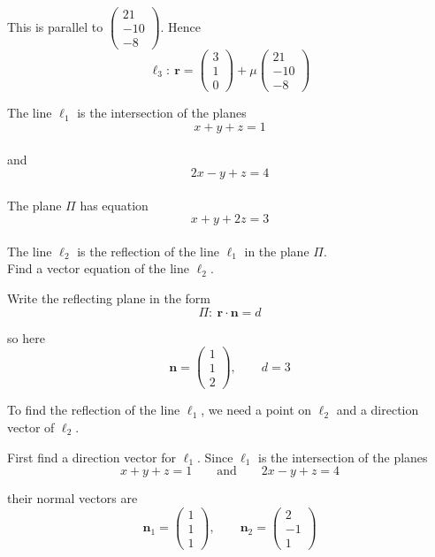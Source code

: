 \documentclass[leqno]{article}
\begin{document}
\begin{enumerate}[
  label=\textbf{\arabic*.},
  leftmargin=*,
  topsep=0pt,
  partopsep=0pt,
  parsep=0pt
]
\begin{djsSolution}
\begin{enumerate}[label=\textbf{(\alph*)}]
{\par}

\vspace{8pt}
This is parallel to \(\begin{pmatrix}21\\-10\\-8\end{pmatrix}\). Hence
\[
\ell_3:\ \mathbf r=
\begin{pmatrix}3\\1\\0\end{pmatrix}
+\mu
\begin{pmatrix}21\\-10\\-8\end{pmatrix}
\]
\end{enumerate}
\end{djsSolution}


\newpage

\questionitem

The line $\ell_1$ is the intersection of the planes
\[
x+y+z=1
\] \\
and
\[
2x-y+z=4
\] \\
The plane $\Pi$ has equation
\[
x+y+2z=3
\] \\
The line $\ell_2$ is the reflection of the line $\ell_1$ in the plane $\Pi$. \\

Find a vector equation of the line $\ell_2$. 

\vspace*{10pt}

\begin{djsSolution}
Write the reflecting plane in the form
\[
\Pi:\ \mathbf r\cdot \mathbf n=d
\]

so here
\[
\mathbf n=\begin{pmatrix}1\\1\\2\end{pmatrix},
\qquad d=3
\]

To find the reflection of the line \(\ell_1\), we need a point on \(\ell_2\) and a direction vector of \(\ell_2\).

First find a direction vector for \(\ell_1\). Since \(\ell_1\) is the intersection of the planes
\[
x+y+z=1
\qquad\text{and}\qquad
2x-y+z=4
\]

their normal vectors are
\[
\mathbf n_1=\begin{pmatrix}1\\1\\1\end{pmatrix},
\qquad
\mathbf n_2=\begin{pmatrix}2\\-1\\1\end{pmatrix}
\]


\end{djsSolution}
\end{enumerate}
\end{document}
